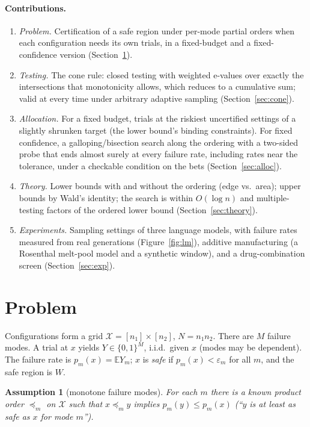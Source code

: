 \documentclass{article}
\newtheorem{assumption}{Assumption}
\newcommand{\eps}{\varepsilon}
\newcommand{\cX}{\mathcal{X}}
\newcommand{\preceqm}{\preceq_m}
\newcommand{\E}{\mathbb{E}}
\begin{document}
\paragraph{Contributions.}
\begin{enumerate}
\item \emph{Problem.} Certification of a safe region under per-mode partial
orders when each configuration needs its own trials, in a fixed-budget and
a fixed-confidence version (Section~\ref{sec:problem}).
\item \emph{Testing.} The cone rule: closed testing with weighted e-values
over exactly the intersections that monotonicity allows, which reduces to
a cumulative sum; valid at every time under arbitrary adaptive sampling
(Section~\ref{sec:cone}).
\item \emph{Allocation.} For a fixed budget, trials at the riskiest
uncertified settings of a slightly shrunken target (the lower bound's
binding constraints). For fixed confidence, a galloping/bisection search
along the ordering with a two-sided probe that ends almost surely at
every failure rate, including rates near the tolerance, under a
checkable condition on the bets (Section~\ref{sec:alloc}).
\item \emph{Theory.} Lower bounds with and without the ordering (edge
vs.\ area); upper bounds by Wald's identity; the search is within
$O(\log n)$ and multiple-testing factors of the ordered lower bound
(Section~\ref{sec:theory}).
\item \emph{Experiments.} Sampling settings of three language models, with
failure rates measured from real generations (Figure~\ref{fig:lm}),
additive manufacturing (a Rosenthal melt-pool model and a synthetic
window), and a drug-combination screen (Section~\ref{sec:exp}).
\end{enumerate}

\section{Problem}\label{sec:problem}

Configurations form a grid $\cX = [n_1]\times[n_2]$, $N = n_1 n_2$. There
are $M$ failure modes. A trial at $x$ yields $Y\in\{0,1\}^M$, i.i.d.\ given
$x$ (modes may be dependent). The failure rate is $p_m(x) = \E Y_m$; $x$ is
\emph{safe} if $p_m(x) < \eps_m$ for all $m$, and the safe region is $W$.

\begin{assumption}[monotone failure modes]
For each $m$ there is a known product order $\preceqm$ on $\cX$ such that
$x \preceqm y$ implies $p_m(y) \le p_m(x)$ (``$y$ is at least as safe as
$x$ for mode $m$'').
\end{assumption}
\end{document}
